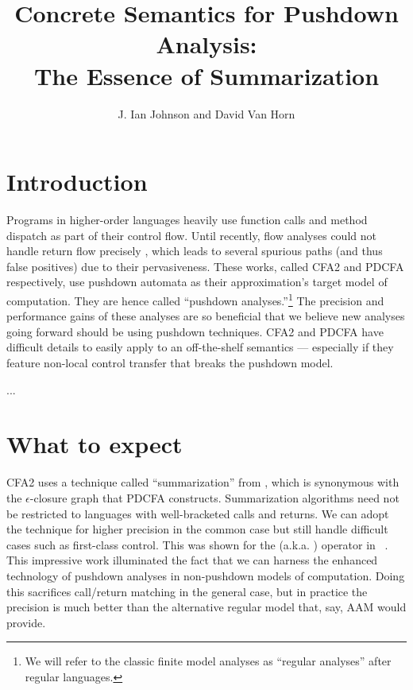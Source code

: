 \documentclass{llncs}
\title{Concrete Semantics for Pushdown Analysis:\\The Essence of Summarization}
\author{J. Ian Johnson and David Van Horn}
\institute{Northeastern University \\
           \email{\{ianj,dvanhorn\}@ccs.neu.edu}}
\newcommand{\Scribtexttt}[1]{{\texttt{#1}}}
\newcommand{\SColorize}[2]{\color{#1}{#2}}
\newcommand{\inColor}[2]{{\Scribtexttt{\SColorize{#1}{#2}}}}
\newcommand{\rackett}[1]{\inColor{black}{#1}}
\begin{document}
\maketitle



\section{Introduction}

Programs in higher-order languages heavily use function calls and
method dispatch as part of their control flow. Until recently, flow
analyses could not handle return flow precisely
\citep{ianjohnson:vardoulakis-lmcs11, ianjohnson:earl2010pdcfa}, which
leads to several spurious paths (and thus false positives) due to
their pervasiveness. These works, called CFA2 and PDCFA respectively,
use pushdown automata as their approximation's target model of
computation. They are hence called ``pushdown analyses.''\footnote{We
  will refer to the classic finite model analyses as ``regular
  analyses'' after regular languages.} The precision and performance
gains of these analyses are so beneficial that we believe new analyses
going forward should be using pushdown techniques. CFA2 and PDCFA have
difficult details to easily apply to an off-the-shelf semantics ---
especially if they feature non-local control transfer that breaks the
pushdown model. 

...


\section{What to expect}

CFA2 uses a technique called ``summarization'' from
\citet[Chapter 7]{local:muchnick:jones:flow-analysis:1981}, which is synonymous with the
$\epsilon$-closure graph that PDCFA constructs. Summarization
algorithms need not be restricted to languages with well-bracketed
calls and returns. We can adopt the technique for higher precision in
the common case but still handle difficult cases such as first-class
control. This was shown for the
\rackett{call-with-current-continuation} (a.k.a. \rackett{call/cc})
operator in ~\citet{ianjohnson:Vardoulakis2011Pushdown}. This
impressive work illuminated the fact that we can harness the enhanced
technology of pushdown analyses in non-pushdown models of
computation. Doing this sacrifices call/return matching in the general
case, but in practice the precision is much better than the
alternative regular model that, say, AAM would provide.
\end{document}
